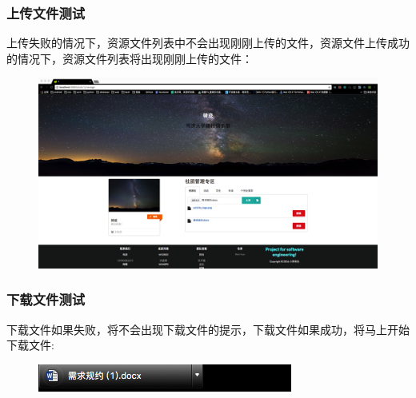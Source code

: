 \documentclass[UTF8]{ctexart}
\begin{document}
\subsubsection{上传文件测试}
上传失败的情况下，资源文件列表中不会出现刚刚上传的文件，资源文件上传成功的情况下，资源文件列表将出现刚刚上传的文件：\\
\begin{figure}[H]
\centering
\includegraphics[width = .8\textwidth]{upload-success.png}
\end{figure}
\subsubsection{下载文件测试}
下载文件如果失败，将不会出现下载文件的提示，下载文件如果成功，将马上开始下载文件:\\
\begin{figure}[H]
\centering
\includegraphics[width = .8\textwidth]{download-success.png}
\end{figure}
\end{document}
